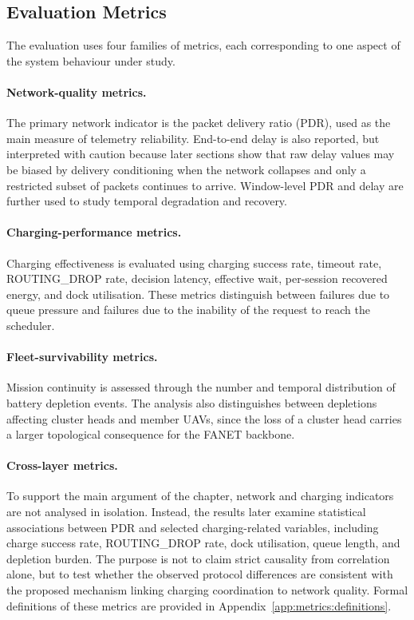 
\subsection{Evaluation Metrics}
\label{sec:results:metrics}

The evaluation uses four families of metrics, each corresponding to one aspect of the
system behaviour under study.

\paragraph{Network-quality metrics.}
The primary network indicator is the packet delivery ratio (PDR), used as the main
measure of telemetry reliability. End-to-end delay is also reported, but interpreted
with caution because later sections show that raw delay values may be biased by
delivery conditioning when the network collapses and only a restricted subset of
packets continues to arrive. Window-level PDR and delay are further used to study
temporal degradation and recovery.

\paragraph{Charging-performance metrics.}
Charging effectiveness is evaluated using charging success rate, timeout rate,
ROUTING\_DROP rate, decision latency, effective wait, per-session recovered energy,
and dock utilisation. These metrics distinguish between failures due to queue
pressure and failures due to the inability of the request to reach the scheduler.

\paragraph{Fleet-survivability metrics.}
Mission continuity is assessed through the number and temporal distribution of
battery depletion events. The analysis also distinguishes between depletions affecting
cluster heads and member UAVs, since the loss of a cluster head carries a larger
topological consequence for the FANET backbone.

\paragraph{Cross-layer metrics.}
To support the main argument of the chapter, network and charging indicators are
not analysed in isolation. Instead, the results later examine statistical associations
between PDR and selected charging-related variables, including charge success rate,
ROUTING\_DROP rate, dock utilisation, queue length, and depletion burden. The
purpose is not to claim strict causality from correlation alone, but to test whether the
observed protocol differences are consistent with the proposed mechanism linking
charging coordination to network quality. Formal definitions of these metrics are
provided in Appendix~\ref{app:metrics:definitions}.

